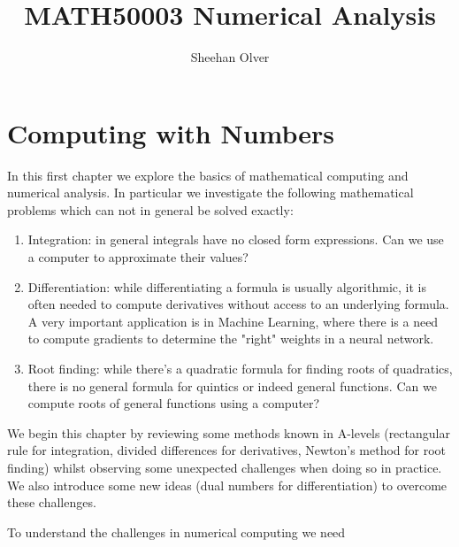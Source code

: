 \documentclass[12pt,a4paper]{book}
\title{ MATH50003 Numerical Analysis }
\author{ Sheehan Olver }
\begin{document}
\maketitle


\chapter{Computing with Numbers}

In this first chapter we explore the basics of mathematical computing and numerical analysis.
In particular we investigate the following mathematical problems which can not in general be solved exactly:

\begin{enumerate}
\item Integration: in general integrals have no closed form expressions. Can we use a computer to approximate their values?
\item Differentiation: while differentiating a formula is usually algorithmic, it is often needed to compute derivatives without access to an underlying formula. A very important application is in Machine Learning, where there is a need to compute gradients to determine the "right" weights in a neural network.
\item Root finding: while there's a quadratic formula for finding roots of quadratics, there is no general formula for quintics or indeed general functions. Can we compute roots of general functions using a computer?
\end{enumerate}

We begin this chapter by reviewing some  methods known in A-levels (rectangular rule for integration, divided differences for derivatives, Newton's method for root finding) whilst observing some unexpected challenges when doing so in practice. We also introduce some new ideas (dual numbers for differentiation) to overcome these challenges.

To understand the challenges in numerical computing we need 


\end{document}
